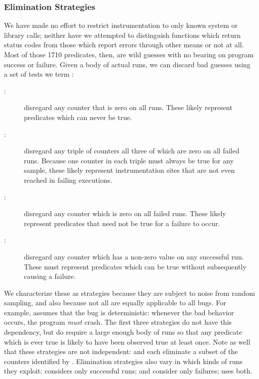 \subsubsection{Elimination Strategies}

We have made no effort to restrict instrumentation to only known
system or library calls; neither have we attempted to distinguish
functions which return status codes from those which report errors
through other means or not at all.  Most of those 1710 predicates,
then, are wild guesses with no bearing on program success or failure.
Given a body of actual runs, we can discard bad guesses using a set of
tests we term :

\begin{description}
\item[:] disregard any
  counter that is zero on all runs.  These likely represent
  predicates which can never be true.

\item[:] disregard any
  triple of counters all three of which are zero on all failed runs.
  Because one counter in each triple must always be true for any
  sample, these likely represent instrumentation sites that are not
  even reached in failing executions.

\item[:] disregard any
  counter which is zero on all failed runs.  These likely represent
  predicates that need not be true for a failure to occur.

\item[:] disregard any
  counter which has a non-zero value on any successful run.  These
  must represent predicates which can be true without subsequently
  causing a failure.
\end{description}

We characterize these as strategies because they are subject to noise
from random sampling, and also because not all are equally applicable
to all bugs.  For example,  assumes that the bug is deterministic: whenever the
bad behavior occurs, the program \emph{must} crash.  The first three
strategies do not have this dependency, but do require a large enough
body of runs so that any predicate which is ever true is likely to
have been observed true at least once.  Note as well that these
strategies are not independent:  and
 each eliminate a subset of the
counters identified by .  Elimination
strategies also vary in which kinds of runs they exploit:
 considers only successful runs;
 and 
consider only failures;  uses both.

